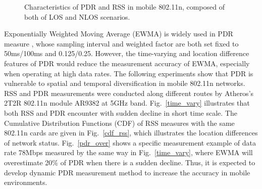\documentclass[draftclsnofoot,journal,onecolumn,11pt]{IEEEtran}
\begin{document}
\begin{figure}[!htp]
\centerline{
}
\caption{Characteristics of PDR and RSS in mobile 802.11n, composed of both of LOS and NLOS scenarios.}
\label{time}
\end{figure}

Exponentially Weighted Moving Average (EWMA) is widely used in PDR measure \cite{ath9k} \cite{minstrel} \cite{wong2008wireless}, whose sampling interval and weighted factor are both set fixed to 50ms/100ms and 0.125/0.25. However, the time-varying and location difference features of PDR would reduce the measurement accuracy of EWMA, especially when operating at high data rates. The following experiments show that PDR is vulnerable to spatial and temporal diversification in mobile 802.11n networks. RSS and PDR measurements were conducted along different routes by Atheros's 2T2R 802.11n module AR9382 at 5GHz band. Fig.~\ref{time_vary} illustrates that both RSS and PDR encounter with sudden decline in short time scale. The Cumulative Distribution Functions (CDF) of RSS measures with the same 802.11n cards are given in Fig.~\ref{cdf_rss}, which illustrates the location differences of network status. Fig.~\ref{pdr_over} shows a specific measurement example of data rate 78Mbps measured by the same way in Fig.~\ref{time_vary}, where EWMA will overestimate 20\% of PDR when there is a sudden decline. Thus, it is expected to develop dynamic PDR measurement method to increase the accuracy in mobile environments.
\end{document}
